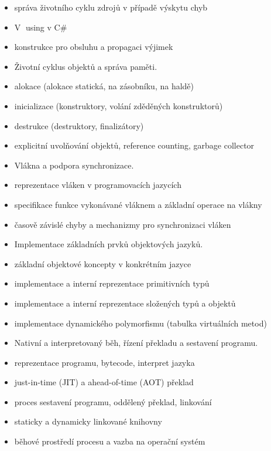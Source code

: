 \begin{tema}
\begin{itemize}[leftmargin=1.2em,itemsep=0pt,topsep=1pt]
  \item správa životního cyklu zdrojů v případě výskytu chyb
  \item \textcircled{V} using v C\#
  \item konstrukce pro obsluhu a propagaci výjimek
  \item Životní cyklus objektů a správa paměti.
  \item alokace (alokace statická, na zásobníku, na haldě)
  \item inicializace (konstruktory, volání zděděných konstruktorů)
  \item destrukce (destruktory, finalizátory)
  \item explicitní uvolňování objektů, reference counting, garbage collector
  \item Vlákna a podpora synchronizace.
  \item reprezentace vláken v programovacích jazycích
  \item specifikace funkce vykonávané vláknem a základní operace na vlákny
  \item časově závislé chyby a mechanizmy pro synchronizaci vláken
  \item Implementace základních prvků objektových jazyků.
  \item základní objektové koncepty v konkrétním jazyce
  \item implementace a interní reprezentace primitivních typů
  \item implementace a interní reprezentace složených typů a objektů
  \item implementace dynamického polymorfismu (tabulka virtuálních metod)
  \item Nativní a interpretovaný běh, řízení překladu a sestavení programu.
  \item reprezentace programu, bytecode, interpret jazyka
  \item just-in-time (JIT) a ahead-of-time (AOT) překlad
  \item proces sestavení programu, oddělený překlad, linkování
  \item staticky a dynamicky linkované knihovny
  \item běhové prostředí procesu a vazba na operační systém
\end{itemize}
\end{tema}
\begin{vezkratce}
\end{vezkratce}

